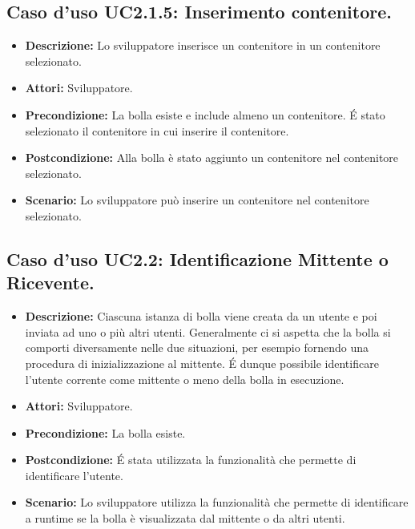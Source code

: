 \subsection{Caso d'uso UC2.1.5: Inserimento contenitore.}
\begin{itemize}
\item[]\textbf{Descrizione:} Lo sviluppatore inserisce  un contenitore in un contenitore selezionato.
\item[]\textbf{Attori:} Sviluppatore. 
\item[]\textbf{Precondizione:} La bolla esiste e include almeno un contenitore. \'E stato
selezionato il contenitore in cui inserire il contenitore. 
\item[]\textbf{Postcondizione:} Alla bolla è stato aggiunto un
contenitore nel contenitore selezionato. 
\item[]\textbf{Scenario:}
Lo sviluppatore può inserire un contenitore nel contenitore selezionato. 
\end{itemize}

\subsection{Caso d'uso UC2.2: Identificazione Mittente o Ricevente.}
\begin{itemize}
\item[]\textbf{Descrizione:} Ciascuna istanza di bolla viene creata da un utente e poi inviata ad uno o più altri utenti. Generalmente ci si aspetta che la bolla si comporti diversamente nelle due situazioni, per esempio fornendo una procedura di inizializzazione al mittente. \'E dunque possibile identificare l'utente corrente come mittente o meno della bolla in esecuzione.
\item[]\textbf{Attori:} Sviluppatore. 
\item[]\textbf{Precondizione:} La bolla esiste. 
\item[]\textbf{Postcondizione:} \'E stata utilizzata la funzionalità che permette di identificare l'utente. 
\item[]\textbf{Scenario:}
Lo sviluppatore utilizza la funzionalità che permette di identificare a runtime se la bolla è visualizzata dal mittente o da altri utenti. 
\end{itemize}

\clearpage

